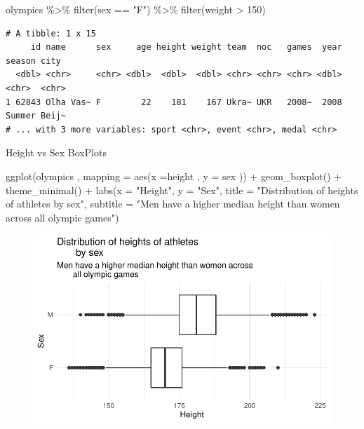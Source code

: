 \documentclass[
  letterpaper,
  DIV=11,
  numbers=noendperiod]{scrartcl}
\newenvironment{Shaded}{\begin{snugshade}}{\end{snugshade}}
\newcommand{\AttributeTok}[1]{\textcolor[rgb]{0.40,0.45,0.13}{#1}}
\newcommand{\DecValTok}[1]{\textcolor[rgb]{0.68,0.00,0.00}{#1}}
\newcommand{\FunctionTok}[1]{\textcolor[rgb]{0.28,0.35,0.67}{#1}}
\newcommand{\NormalTok}[1]{\textcolor[rgb]{0.00,0.23,0.31}{#1}}
\newcommand{\SpecialCharTok}[1]{\textcolor[rgb]{0.37,0.37,0.37}{#1}}
\newcommand{\StringTok}[1]{\textcolor[rgb]{0.13,0.47,0.30}{#1}}
\begin{document}
\begin{Shaded}
\begin{Highlighting}[]
\NormalTok{olympics }\SpecialCharTok{\%\textgreater{}\%}
  \FunctionTok{filter}\NormalTok{(sex }\SpecialCharTok{==} \StringTok{"F"}\NormalTok{) }\SpecialCharTok{\%\textgreater{}\%}
  \FunctionTok{filter}\NormalTok{(weight }\SpecialCharTok{\textgreater{}} \DecValTok{150}\NormalTok{)}
\end{Highlighting}
\end{Shaded}

\begin{verbatim}
# A tibble: 1 x 15
     id name      sex     age height weight team  noc   games  year season city 
  <dbl> <chr>     <chr> <dbl>  <dbl>  <dbl> <chr> <chr> <chr> <dbl> <chr>  <chr>
1 62843 Olha Vas~ F        22    181    167 Ukra~ UKR   2008~  2008 Summer Beij~
# ... with 3 more variables: sport <chr>, event <chr>, medal <chr>
\end{verbatim}

Height vs Sex BoxPlots

\begin{Shaded}
\begin{Highlighting}[]
\FunctionTok{ggplot}\NormalTok{(olympics , }\AttributeTok{mapping =} \FunctionTok{aes}\NormalTok{(}\AttributeTok{x =}\NormalTok{height , }\AttributeTok{y =}\NormalTok{ sex )) }\SpecialCharTok{+} 
  \FunctionTok{geom\_boxplot}\NormalTok{() }\SpecialCharTok{+} 
  \FunctionTok{theme\_minimal}\NormalTok{() }\SpecialCharTok{+} 
  \FunctionTok{labs}\NormalTok{(}\AttributeTok{x =} \StringTok{"Height"}\NormalTok{, }\AttributeTok{y =} \StringTok{"Sex"}\NormalTok{, }\AttributeTok{title =} \StringTok{"Distribution of heights of athletes }
\StringTok{       by sex"}\NormalTok{, }\AttributeTok{subtitle =} \StringTok{"Men have a higher median height than women across}
\StringTok{       all olympic games"}\NormalTok{)}
\end{Highlighting}
\end{Shaded}

\begin{figure}[H]

{\centering \includegraphics{project_files/figure-pdf/unnamed-chunk-8-1.pdf}

}

\end{figure}
\end{document}
